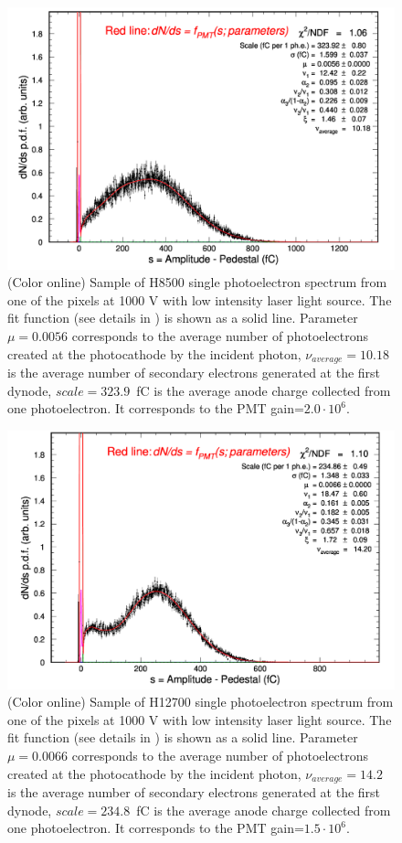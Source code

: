 \documentclass[5p,times,twocolumn]{elsarticle}
\begin{document}
\begin{figure}[bth]
	\centering
	\includegraphics[width=\linewidth]{H8500-r-W0-CA7709-w3-g064-v1000-t227-37.pdf}
	\caption{(Color online)	
	Sample of H8500 single photoelectron spectrum from one of the pixels at 1000 V with low intensity laser light source.
The fit function (see details in \cite{Pavel}) is shown as a solid line. 
Parameter $\mu=0.0056$ corresponds to the average number of photoelectrons created at the photocathode by the incident photon,  $\nu_{average}=10.18$ is  the average number of secondary electrons generated at the first dynode, $scale=323.9$~fC is the average anode charge collected from one photoelectron. It corresponds to the PMT gain=$2.0\cdot 10^6$.
}
	\label{fig:SPEH8500}
\end{figure}


\begin{figure}[ht]
	\centering
	\includegraphics[width=\linewidth]{H12700-r-W0-GA0982-w3-g064-v1000-t227-37.pdf}
	\caption{(Color online) 
Sample of H12700 single photoelectron spectrum from one of the pixels at 1000 V with low intensity laser light source. 
The fit function (see details in \cite{Pavel}) is shown as a solid line. 
Parameter $\mu=0.0066$ corresponds to the average number of photoelectrons created at the photocathode by the incident photon,  $\nu_{average}=14.2$ is  the average number of secondary electrons generated at the first dynode, $scale=234.8$~fC is the average anode charge collected from one photoelectron. It corresponds to the PMT gain=$1.5\cdot 10^6$.
}
	\label{fig:SPEH12700}
\end{figure}
\end{document}
